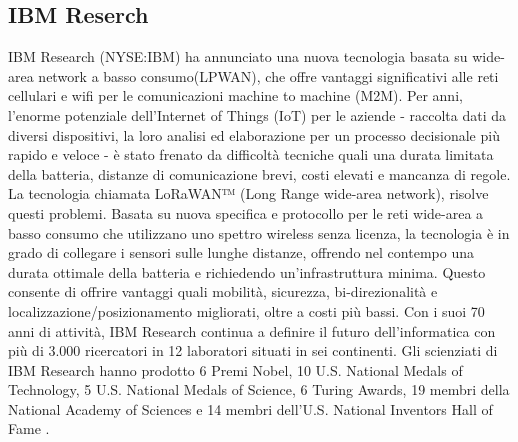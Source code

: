 \documentclass[a4paper]{report} %
\begin{document}
\subsection{IBM Reserch}
IBM Research (NYSE:IBM) ha annunciato una nuova tecnologia basata su wide-area network a basso consumo(LPWAN), che offre vantaggi significativi alle reti cellulari e wifi per le comunicazioni machine to machine (M2M). Per anni, l'enorme potenziale dell’Internet of Things (IoT) per le aziende - raccolta dati da diversi dispositivi, la loro analisi ed elaborazione per un processo decisionale più rapido e veloce - è stato frenato da difficoltà tecniche quali una durata limitata della batteria, distanze di comunicazione brevi, costi elevati e mancanza di regole. La tecnologia chiamata LoRaWAN™ (Long Range wide-area network), risolve questi problemi. Basata su nuova specifica e protocollo per le reti wide-area a basso consumo che utilizzano uno spettro wireless senza licenza, la tecnologia è in grado di collegare i sensori sulle lunghe distanze, offrendo nel contempo una durata ottimale della batteria e richiedendo un'infrastruttura minima. Questo consente di offrire vantaggi quali mobilità, sicurezza, bi-direzionalità e localizzazione/posizionamento migliorati, oltre a costi più bassi.
Con i suoi 70 anni di attività, IBM Research continua a definire il futuro dell'informatica con più di 3.000 ricercatori in 12 laboratori situati in sei continenti. Gli scienziati di IBM Research hanno prodotto 6 Premi Nobel, 10 U.S. National Medals of Technology, 5 U.S. National Medals of Science, 6 Turing Awards, 19 membri della National Academy of Sciences e 14 membri dell'U.S. National Inventors Hall of Fame \cite{art:rif.25, art:rif.26}.
\end{document}
